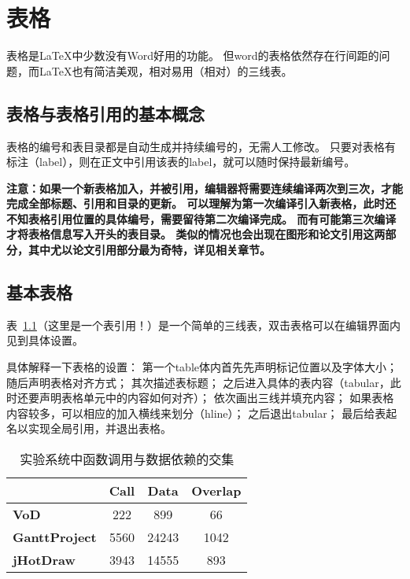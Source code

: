 \chapter{表格}

表格是LaTeX中少数没有Word好用的功能。
但word的表格依然存在行间距的问题，而LaTeX也有简洁美观，相对易用（相对）的三线表。

\section{表格与表格引用的基本概念}
表格的编号和表目录都是自动生成并持续编号的，无需人工修改。
只要对表格有标注（label），则在正文中引用该表的label，就可以随时保持最新编号。

\textbf{注意：如果一个新表格加入，并被引用，编辑器将需要连续编译两次到三次，才能完成全部标题、引用和目录的更新。
可以理解为第一次编译引入新表格，此时还不知表格引用位置的具体编号，需要留待第二次编译完成。
而有可能第三次编译才将表格信息写入开头的表目录。
类似的情况也会出现在图形和论文引用这两部分，其中尤以论文引用部分最为奇特，详见相关章节。}

\section{基本表格}

表~\ref{table:codeOverlap}（这里是一个表引用！）是一个简单的三线表，双击表格可以在编辑界面内见到具体设置。

具体解释一下表格的设置：
第一个table体内首先先声明标记位置以及字体大小；
随后声明表格对齐方式；
其次描述表标题；
之后进入具体的表内容（tabular，此时还要声明表格单元中的内容如何对齐）；
依次画出三线并填充内容；
如果表格内容较多，可以相应的加入横线来划分（hline）；
之后退出tabular；
最后给表起名以实现全局引用，并退出表格。

\begin{table}[htb]\footnotesize
\centering
\caption{实验系统中函数调用与数据依赖的交集}
\vspace{2mm}
\begin{tabular}{lccc}
\toprule
&\textbf{Call}&\textbf{Data}&\textbf{Overlap}\\
\midrule
\textbf{VoD}&222&899&66\\
\textbf{GanttProject}&5560&24243&1042\\
\hline
\textbf{jHotDraw}&3943&14555&893\\
\bottomrule
\end{tabular}
\label{table:codeOverlap}
\end{table}

